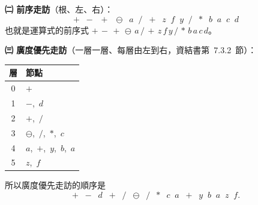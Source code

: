 \begin{pastsoln}
\textbf{㈡ 前序走訪}（根、左、右）：
\[
+ \;\; - \;\; + \;\; \ominus \;\; a \;\; / \;\; + \;\; z \;\; f \;\; y \;\; / \;\; * \;\; b \;\; a \;\; c \;\; d
\]
也就是運算式的前序式 $+\,-\,+\,\ominus\,a\,/\,+\,z\,f\,y\,/\,*\,b\,a\,c\,d$。

\textbf{㈢ 廣度優先走訪}（一層一層、每層由左到右，資結書第~7.3.2~節）：
\begin{center}
\begin{tabular}{cl}
\toprule
層 & 節點 \\
\midrule
0 & $+$ \\
1 & $-$,\ $d$ \\
2 & $+$,\ $/$ \\
3 & $\ominus$,\ $/$,\ $*$,\ $c$ \\
4 & $a$,\ $+$,\ $y$,\ $b$,\ $a$ \\
5 & $z$,\ $f$ \\
\bottomrule
\end{tabular}
\end{center}
所以廣度優先走訪的順序是
\[
+ \;\; - \;\; d \;\; + \;\; / \;\; \ominus \;\; / \;\; * \;\; c \;\; a \;\; + \;\; y \;\; b \;\; a \;\; z \;\; f .
\]
\end{pastsoln}
